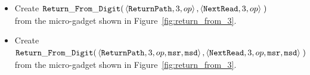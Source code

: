 \begin{itemize}
    \item Create
    $\begin{aligned}[t]
        {\tt Return\_From\_Digit}(& \left\langle {\tt ReturnPath},    3, op \right\rangle,
                           \left\langle {\tt NextRead}, 3, op \right\rangle \;)
    \end{aligned}$\\from the micro-gadget shown in Figure~\ref{fig:return_from_3}.


    \item Create
    $\begin{aligned}[t]
        {\tt Return\_From\_Digit}(& \left\langle {\tt ReturnPath},    3, op, {\tt msr}, {\tt msd} \right\rangle,
                           \left\langle {\tt NextRead}, 3, op, {\tt msr}, {\tt msd} \right\rangle \;)
    \end{aligned}$\\from the micro-gadget shown in Figure~\ref{fig:return_from_3}.

\end{itemize}

